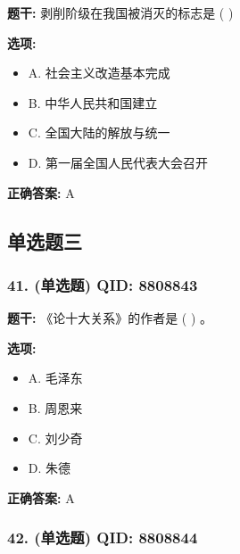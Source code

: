 \documentclass[12pt,UTF8]{ctexart}
\begin{document}
\textbf{题干:}
剥削阶级在我国被消灭的标志是  ( )

\textbf{选项:}
\begin{itemize}[leftmargin=*]

  \item A. 社会主义改造基本完成

  \item B. 中华人民共和国建立

  \item C. 全国大陆的解放与统一

  \item D. 第一届全国人民代表大会召开

\end{itemize}

\textbf{正确答案:}
A

\vspace{0.3em}\hrulefill\vspace{0.7em}

\subsection*{单选题三}

\subsubsection*{41. (单选题) \small QID: 8808843}

\textbf{题干:}
《论十大关系》的作者是 ( ) 。

\textbf{选项:}
\begin{itemize}[leftmargin=*]

  \item A. 毛泽东

  \item B. 周恩来

  \item C. 刘少奇

  \item D. 朱德

\end{itemize}

\textbf{正确答案:}
A

\vspace{0.3em}\hrulefill\vspace{0.7em}

\subsubsection*{42. (单选题) \small QID: 8808844}
\end{document}
